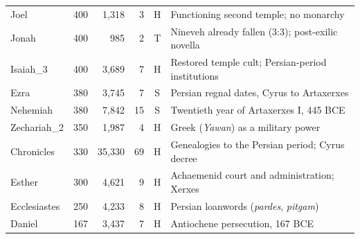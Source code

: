 \begin{table}[!ht]
\begin{tabular}{llrrcp{4.6cm}}
Joel & 400 & 1,318 & 3 & H & Functioning second temple; no monarchy \\
Jonah & 400 & 985 & 2 & T & Nineveh already fallen (3:3); post-exilic novella \\
Isaiah\_3 & 400 & 3,689 & 7 & H & Restored temple cult; Persian-period institutions \\
Ezra & 380 & 3,745 & 7 & S & Persian regnal dates, Cyrus to Artaxerxes \\
Nehemiah & 380 & 7,842 & 15 & S & Twentieth year of Artaxerxes I, 445 BCE \\
Zechariah\_2 & 350 & 1,987 & 4 & H & Greek (\textit{Yawan}) as a military power \\
Chronicles & 330 & 35,330 & 69 & H & Genealogies to the Persian period; Cyrus decree \\
Esther & 300 & 4,621 & 9 & H & Achaemenid court and administration; Xerxes \\
Ecclesiastes & 250 & 4,233 & 8 & H & Persian loanwords (\textit{pardes}, \textit{pitgam}) \\
Daniel & 167 & 3,437 & 7 & H & Antiochene persecution, 167 BCE \\
\bottomrule
\end{tabular}
\end{table}
